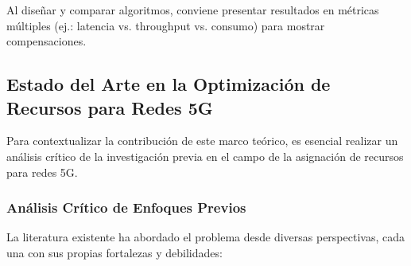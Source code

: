 \documentclass[12pt,a4paper]{article}
\begin{document}
Al diseñar y comparar algoritmos, conviene presentar resultados en métricas múltiples (ej.: latencia vs. throughput vs. consumo) para mostrar compensaciones.

\subsection{Estado del Arte en la Optimización de Recursos para Redes 5G}

Para contextualizar la contribución de este marco teórico, es esencial realizar un análisis crítico de la investigación previa en el campo de la asignación de recursos para redes 5G.

\subsubsection{Análisis Crítico de Enfoques Previos}

La literatura existente ha abordado el problema desde diversas perspectivas, cada una con sus propias fortalezas y debilidades:
\end{document}
